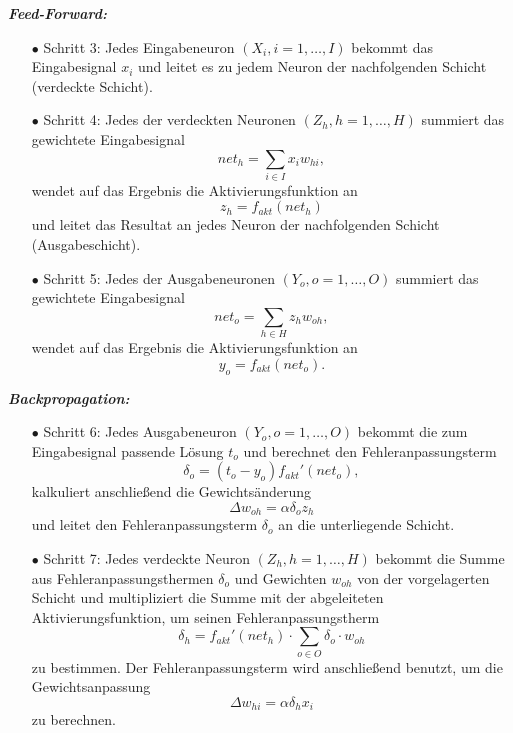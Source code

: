 \textbf{\textit{Feed-Forward:}}
\begin{itemize}
\item[\textbf{$\bullet$}] Schritt 3: Jedes Eingabeneuron $(X_{i}, i=1,\dots,I)$ bekommt das Eingabesignal $x_{i}$ und leitet es zu jedem Neuron der nachfolgenden Schicht (verdeckte Schicht).

\item[\textbf{$\bullet$}] Schritt 4: Jedes der verdeckten Neuronen $(Z_{h}, h=1,\dots,H)$ summiert das gewichtete Eingabesignal
\begin{equation}
net_{h}=\sum\limits_{i \in I} x_{i}w_{hi},
\end{equation}
wendet auf das Ergebnis die Aktivierungsfunktion an 
\begin{equation}
z_{h}=f_{akt}(net_{h})
\end{equation}
und leitet das Resultat an jedes Neuron der nachfolgenden Schicht (Ausgabeschicht).

\item[\textbf{$\bullet$}] Schritt 5: Jedes der Ausgabeneuronen $(Y_{o}, o=1,\dots,O)$ summiert das gewichtete Eingabesignal 
\begin{equation}
net_{o}=\sum\limits_{h \in H} z_{h}w_{oh},
\end{equation}
wendet auf das Ergebnis die Aktivierungsfunktion an 
\begin{equation}
y_{o}=f_{akt}(net_{o}).
\end{equation}
\end{itemize}

\textbf{\textit{Backpropagation:}}
\begin{itemize}
\item[\textbf{$\bullet$}] Schritt 6: Jedes Ausgabeneuron $(Y_{o}, o=1,\dots,O)$ bekommt die zum Eingabesignal passende Lösung $t_{o}$ und berechnet den Fehleranpassungsterm 
\begin{equation}
\delta_{o}=(t_{o}-y_{o})f_{akt}'(net_{o}),
\end{equation}
kalkuliert anschließend die Gewichtsänderung 
\begin{equation}
\Delta w_{oh}=\alpha \delta_{o} z_{h}
\end{equation}
und leitet den Fehleranpassungsterm $\delta_{o}$ an die unterliegende Schicht.

\item[\textbf{$\bullet$}] Schritt 7: Jedes verdeckte Neuron $(Z_{h}, h=1,\dots,H)$ bekommt die Summe aus Fehleranpassungsthermen $\delta_o$ und Gewichten $w_{oh}$ von der vorgelagerten Schicht und multipliziert die Summe mit der abgeleiteten Aktivierungsfunktion, um seinen Fehleranpassungstherm 
\begin{equation}
\delta_{h}=f_{akt}'(net_{h}) \cdot \sum\limits_{o \in O} \delta_{o} \cdot w_{oh}
\end{equation}
zu bestimmen. Der Fehleranpassungsterm wird anschließend benutzt, um die Gewichtsanpassung 
\begin{equation}
\Delta w_{hi}=\alpha \delta_{h} x_{i}
\end{equation}
zu berechnen.
\end{itemize}

